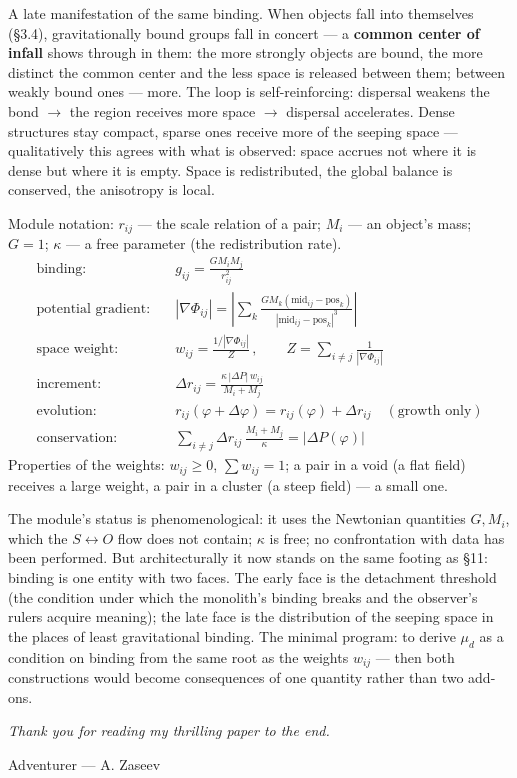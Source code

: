 \documentclass{article}
\begin{document}
A late manifestation of the same binding. When objects fall into themselves (\S3.4), gravitationally bound groups fall in concert --- a \textbf{common center of infall} shows through in them: the more strongly objects are bound, the more distinct the common center and the less space is released between them; between weakly bound ones --- more. The loop is self-reinforcing: dispersal weakens the bond $\to$ the region receives more space $\to$ dispersal accelerates. Dense structures stay compact, sparse ones receive more of the seeping space --- qualitatively this agrees with what is observed: space accrues not where it is dense but where it is empty. Space is redistributed, the global balance is conserved, the anisotropy is local.

Module notation: $r_{ij}$ --- the scale relation of a pair; $M_i$ --- an object's mass; $G = 1$; $\kappa$ --- a free parameter (the redistribution rate).
\begin{align}
\text{binding:} &\quad g_{ij} = \frac{G M_i M_j}{r_{ij}^2} \\
\text{potential gradient:} &\quad |\nabla\Phi_{ij}| = \left| \sum_k \frac{G M_k (\text{mid}_{ij} - \text{pos}_k)}{|\text{mid}_{ij} - \text{pos}_k|^3} \right| \\
\text{space weight:} &\quad w_{ij} = \frac{1/|\nabla\Phi_{ij}|}{Z}\,, \qquad Z = \sum_{i\neq j} \frac{1}{|\nabla\Phi_{ij}|} \\
\text{increment:} &\quad \Delta r_{ij} = \frac{\kappa\,|\Delta P|\,w_{ij}}{M_i + M_j} \\
\text{evolution:} &\quad r_{ij}(\varphi+\Delta\varphi) = r_{ij}(\varphi) + \Delta r_{ij} \quad (\text{growth only}) \\
\text{conservation:} &\quad \sum_{i\neq j} \Delta r_{ij}\,\frac{M_i + M_j}{\kappa} = |\Delta P(\varphi)|
\end{align}
Properties of the weights: $w_{ij} \ge 0$, $\sum w_{ij} = 1$; a pair in a void (a flat field) receives a large weight, a pair in a cluster (a steep field) --- a small one.

The module's status is phenomenological: it uses the Newtonian quantities $G, M_i$, which the $S \leftrightarrow O$ flow does not contain; $\kappa$ is free; no confrontation with data has been performed. But architecturally it now stands on the same footing as \S11: binding is one entity with two faces. The early face is the detachment threshold (the condition under which the monolith's binding breaks and the observer's rulers acquire meaning); the late face is the distribution of the seeping space in the places of least gravitational binding. The minimal program: to derive $\mu_d$ as a condition on binding from the same root as the weights $w_{ij}$ --- then both constructions would become consequences of one quantity rather than two add-ons.

\bigskip
\noindent\textit{Thank you for reading my thrilling paper to the end.}

\medskip
\noindent Adventurer --- A. Zaseev
\end{document}
